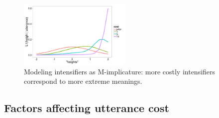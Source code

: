 \documentclass[10pt,letterpaper]{article}
\newcommand{\todo}[1]{{\color{red}#1}}
\begin{document}
\begin{figure}[ht]
\begin{center}
\includegraphics[width=0.48\textwidth]{analysis_files_for_writeup/images/model_results.png}
\end{center}
\caption{Modeling intensifiers as M-implicature: more costly intensifiers correspond to more extreme meanings.} 
\label{model}
\end{figure}

% 
\subsection{Factors affecting utterance cost}
\end{document}
